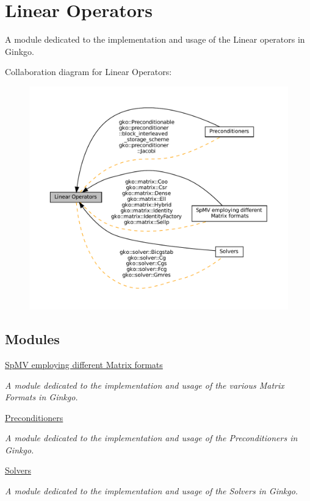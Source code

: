 \hypertarget{group__LinOp}{}\section{Linear Operators}
\label{group__LinOp}


A module dedicated to the implementation and usage of the Linear operators in Ginkgo.  


Collaboration diagram for Linear Operators\+:
\nopagebreak
\begin{figure}[H]
\begin{center}
\leavevmode
\includegraphics[width=350pt]{group__LinOp}
\end{center}
\end{figure}
\subsection*{Modules}
\begin{DoxyCompactItemize}
\item 
\hyperlink{group__mat__formats}{Sp\+M\+V employing different Matrix formats}
\begin{DoxyCompactList}\small\item\em A module dedicated to the implementation and usage of the various Matrix Formats in Ginkgo. \end{DoxyCompactList}\item 
\hyperlink{group__precond}{Preconditioners}
\begin{DoxyCompactList}\small\item\em A module dedicated to the implementation and usage of the Preconditioners in Ginkgo. \end{DoxyCompactList}\item 
\hyperlink{group__solvers}{Solvers}
\begin{DoxyCompactList}\small\item\em A module dedicated to the implementation and usage of the Solvers in Ginkgo. \end{DoxyCompactList}\end{DoxyCompactItemize}
